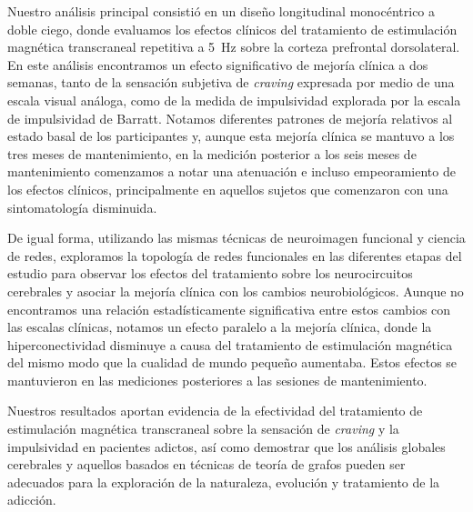 Nuestro análisis principal consistió en un diseño longitudinal monocéntrico a doble ciego, donde evaluamos los efectos clínicos del tratamiento de estimulación magnética transcraneal repetitiva a \SI{5}{\hertz} sobre la corteza prefrontal dorsolateral.
En este análisis encontramos un efecto significativo de mejoría clínica a dos semanas, tanto de la sensación subjetiva de \textit{craving} expresada por medio de una escala visual análoga, como de la medida de impulsividad explorada por la escala de impulsividad de Barratt. Notamos diferentes patrones de mejoría relativos al estado basal de los participantes y, aunque esta mejoría clínica se mantuvo a los tres meses de mantenimiento, en la medición posterior a los seis meses de mantenimiento comenzamos a notar una atenuación e incluso empeoramiento de los efectos clínicos, principalmente en aquellos sujetos que comenzaron con una sintomatología disminuida.\par
De igual forma, utilizando las mismas técnicas de neuroimagen funcional y ciencia de redes, exploramos la topología de redes funcionales en las diferentes etapas del estudio para observar los efectos del tratamiento sobre los neurocircuitos cerebrales y asociar la mejoría clínica con los cambios neurobiológicos. Aunque no encontramos una relación estadísticamente significativa entre estos cambios con las escalas clínicas, notamos un efecto paralelo a la mejoría clínica, donde la hiperconectividad disminuye a causa del tratamiento de estimulación magnética del mismo modo que la cualidad de mundo pequeño aumentaba. Estos efectos se mantuvieron en las mediciones posteriores a las sesiones de mantenimiento.\par
Nuestros resultados aportan evidencia de la efectividad del tratamiento de estimulación magnética transcraneal sobre la sensación de \textit{craving} y la impulsividad en pacientes adictos, así como demostrar que los análisis globales cerebrales y aquellos basados en técnicas de teoría de grafos pueden ser adecuados para la exploración de la naturaleza, evolución y tratamiento de la adicción.
